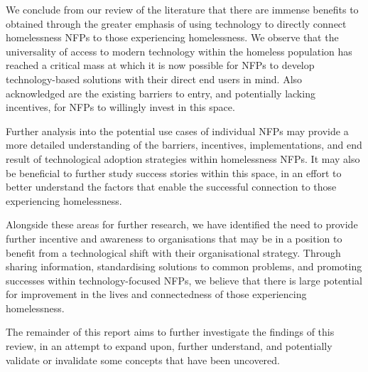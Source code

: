 We conclude from our review of the literature that there are immense benefits to obtained through the greater emphasis of using technology to directly connect homelessness NFPs to those experiencing homelessness. We observe that the universality of access to modern technology within the homeless population has reached a critical mass at which it is now possible for NFPs to develop technology-based solutions with their direct end users in mind. Also acknowledged are the existing barriers to entry, and potentially lacking incentives, for NFPs to willingly invest in this space.

Further analysis into the potential use cases of individual NFPs may provide a more detailed understanding of the barriers, incentives, implementations, and end result of technological adoption strategies within homelessness NFPs. It may also be beneficial to further study success stories within this space, in an effort to better understand the factors that enable the successful connection to those experiencing homelessness.

Alongside these areas for further research, we have identified the need to provide further incentive and awareness to organisations that may be in a position to benefit from a technological shift with their organisational strategy. Through sharing information, standardising solutions to common problems, and promoting successes within technology-focused NFPs, we believe that there is large potential for improvement in the lives and connectedness of those experiencing homelessness.

The remainder of this report aims to further investigate the findings of this review, in an attempt to expand upon, further understand, and potentially validate or invalidate some concepts that have been uncovered.